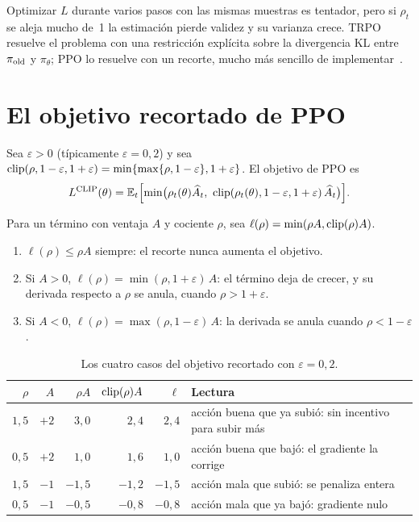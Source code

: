 Optimizar $L$ durante varios pasos con las mismas muestras es tentador, pero si $\rho_t$ se aleja mucho de~1 la estimación pierde validez y su varianza crece. TRPO resuelve el problema con una restricción explícita sobre la divergencia KL entre $\pi_{\mathrm{old}}$ y $\pi_\theta$; PPO lo resuelve con un recorte, mucho más sencillo de implementar~\cite{cs285,ppo}.

\section{El objetivo recortado de PPO}

\begin{definicion}\label{def:ppo}
Sea $\varepsilon>0$ (típicamente $\varepsilon=0{,}2$) y sea $\operatorname{clip}(\rho,1-\varepsilon,1+\varepsilon)=\min\{\max\{\rho,1-\varepsilon\},1+\varepsilon\}$. El objetivo de PPO es~\cite[§3]{ppo}
\[
L^{\mathrm{CLIP}}(\theta)=\mathbb{E}_t\Bigl[\min\bigl(\rho_t(\theta)\widehat A_t,\ \operatorname{clip}(\rho_t(\theta),1-\varepsilon,1+\varepsilon)\,\widehat A_t\bigr)\Bigr].
\]
\end{definicion}

\begin{proposicion}\label{prop:ppo-casos}
Para un término con ventaja $A$ y cociente $\rho$, sea $\ell(\rho)=\min(\rho A,\operatorname{clip}(\rho)A)$.
\begin{enumerate}
  \item $\ell(\rho)\le\rho A$ siempre: el recorte nunca aumenta el objetivo.
  \item Si $A>0$, $\ell(\rho)=\min(\rho,1+\varepsilon)\,A$: el término deja de crecer, y su derivada respecto a $\rho$ se anula, cuando $\rho>1+\varepsilon$.
  \item Si $A<0$, $\ell(\rho)=\max(\rho,1-\varepsilon)\,A$: la derivada se anula cuando $\rho<1-\varepsilon$.
\end{enumerate}
\end{proposicion}

\begin{table}[h]
\centering\small
\begin{tabular}{@{}rrrrrl@{}}
\toprule
$\rho$ & $A$ & $\rho A$ & $\operatorname{clip}(\rho)A$ & $\ell$ & Lectura \\
\midrule
$1{,}5$ & $+2$ & $3{,}0$ & $2{,}4$ & $2{,}4$ & acción buena que ya subió: sin incentivo para subir más \\
$0{,}5$ & $+2$ & $1{,}0$ & $1{,}6$ & $1{,}0$ & acción buena que bajó: el gradiente la corrige \\
$1{,}5$ & $-1$ & $-1{,}5$ & $-1{,}2$ & $-1{,}5$ & acción mala que subió: se penaliza entera \\
$0{,}5$ & $-1$ & $-0{,}5$ & $-0{,}8$ & $-0{,}8$ & acción mala que ya bajó: gradiente nulo \\
\bottomrule
\end{tabular}
\caption{Los cuatro casos del objetivo recortado con $\varepsilon=0{,}2$.}
\label{tab:ppo}
\end{table}


